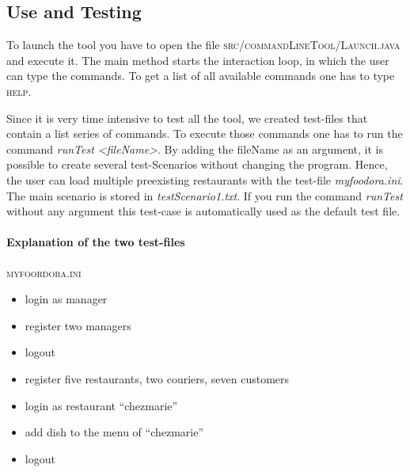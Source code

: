 \subsection{Use and Testing}
\label{sub:use_and_testing}

To launch the tool you have to open the file \textsc{src/commandLineTool/Launch.java} and execute
it. The main method starts the interaction loop, in which the user can type the commands. To get
a list of all available commands one has to type \textsc{help}. 

Since it is very time intensive to test all the tool, we created test-files that
contain a list series of commands. To execute those commands one has to run the command 
\textit{runTest <fileName>}. By adding the fileName as an argument, it is possible to create 
several test-Scenarios without changing the program. Hence, the user can load multiple 
preexisting restaurants with the test-file \textit{my\textunderscore foodora.ini}.
The main scenario is stored in \textit{testScenario1.txt}. If you run the command
\textit{runTest} without any argument this test-case is automatically used as the default test
file.

\paragraph{Explanation of the two test-files}
\label{par:explanation_of_the_two_test_files}

\textsc{my\textunderscore foordora.ini}
\begin{itemize}[itemsep=0mm]
	\item login as manager
	\item register two managers
	\item logout
	\item register five restaurants, two couriers, seven customers
	\item login as restaurant ``chezmarie''
	\item add dish to the menu of ``chezmarie''
	\item logout
\end{itemize}

